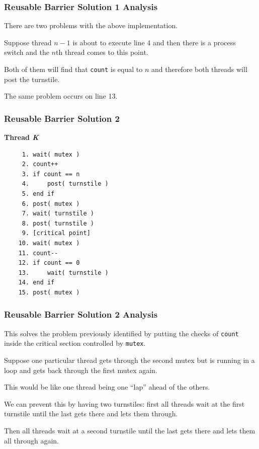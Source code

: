 \begin{frame}
\frametitle{Reusable Barrier Solution 1 Analysis}

There are two problems with the above implementation. 

Suppose thread $n-1$ is about to execute line 4 and then there is a process switch and the $n$th thread comes to this point. 

Both of them will find that \texttt{count} is equal to $n$ and therefore both threads will post the turnstile. 

The same problem occurs on line 13.


\end{frame}

\begin{frame}[fragile]
\frametitle{Reusable Barrier Solution 2}

\textbf{Thread \textit{K}}\vspace{-2em}
  \begin{verbatim}
	 1. wait( mutex )
	 2. count++
	 3. if count == n
	 4.     post( turnstile )
	 5. end if
	 6. post( mutex )
	 7. wait( turnstile )
	 8. post( turnstile )
	 9. [critical point]
	10. wait( mutex )
	11. count--
	12. if count == 0
	13.     wait( turnstile )
	14. end if
	15. post( mutex )
  \end{verbatim}
\vspace{-2em}

\end{frame}


\begin{frame}
\frametitle{Reusable Barrier Solution 2 Analysis}

This solves the problem previously identified by putting the checks of \texttt{count} inside the critical section controlled by \texttt{mutex}. 

Suppose one particular thread gets through the second mutex but is running in a loop and gets back through the first mutex again. 

This would be like one thread being one ``lap'' ahead of the others. 

We can prevent this by having two turnstiles: first all threads wait at the first turnstile until the last gets there and lets them through. 

Then all threads wait at a second turnstile until the last gets there and lets them all through again. 


\end{frame}

